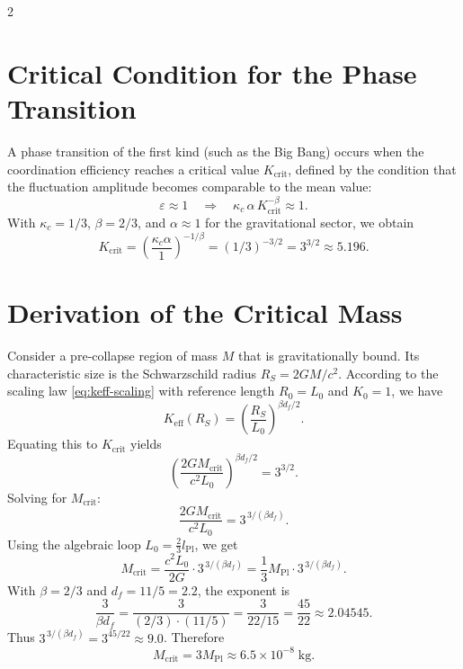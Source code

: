 \documentclass[12pt,a4paper]{article}
\newcommand{\kappac}{\kappa_c}
\newcommand{\Keff}{K_{\mathrm{eff}}}
\newcommand{\betaf}{\beta}
\newcommand{\Lpl}{l_{\mathrm{Pl}}}
\newcommand{\Lzero}{L_0}
\begin{document}
	\begin{multicols}{2}
		
		\section{Critical Condition for the Phase Transition}
		\label{sec:critical-condition}
		
		A phase transition of the first kind (such as the Big Bang) occurs when the coordination efficiency reaches a critical value \(K_{\mathrm{crit}}\), defined by the condition that the fluctuation amplitude becomes comparable to the mean value:
		\begin{equation}
			\varepsilon \approx 1 \quad \Longrightarrow \quad \kappac \, \alpha \, K_{\mathrm{crit}}^{-\betaf} \approx 1.
			\label{eq:critical-condition}
		\end{equation}
		With \(\kappac = 1/3\), \(\betaf = 2/3\), and \(\alpha \approx 1\) for the gravitational sector, we obtain
		\begin{equation}
			K_{\mathrm{crit}} = \left( \frac{\kappac \alpha}{1} \right)^{-1/\betaf} = (1/3)^{-3/2} = 3^{3/2} \approx 5.196.
			\label{eq:Kcrit}
		\end{equation}
		
		\section{Derivation of the Critical Mass}
		\label{sec:derivation}
		
		Consider a pre‑collapse region of mass \(M\) that is gravitationally bound. Its characteristic size is the Schwarzschild radius \(R_S = 2GM/c^2\). According to the scaling law \eqref{eq:keff-scaling} with reference length \(R_0 = \Lzero\) and \(K_0 = 1\), we have
		\[
		\Keff(R_S) = \left( \frac{R_S}{\Lzero} \right)^{\betaf d_f / 2}.
		\]
		Equating this to \(K_{\mathrm{crit}}\) yields
		\[
		\left( \frac{2GM_{\mathrm{crit}}}{c^2 \Lzero} \right)^{\betaf d_f / 2} = 3^{3/2}.
		\]
		Solving for \(M_{\mathrm{crit}}\):
		\[
		\frac{2GM_{\mathrm{crit}}}{c^2 \Lzero} = 3^{\,3/(\betaf d_f)}.
		\]
		Using the algebraic loop \(\Lzero = \frac{2}{3} \Lpl\), we get
		\[
		M_{\mathrm{crit}} = \frac{c^2 \Lzero}{2G} \cdot 3^{\,3/(\betaf d_f)} = \frac{1}{3} M_{\mathrm{Pl}} \cdot 3^{\,3/(\betaf d_f)}.
		\]
		With \(\betaf = 2/3\) and \(d_f = 11/5 = 2.2\), the exponent is
		\[
		\frac{3}{\betaf d_f} = \frac{3}{(2/3) \cdot (11/5)} = \frac{3}{22/15} = \frac{45}{22} \approx 2.04545.
		\]
		Thus \(3^{\,3/(\betaf d_f)} = 3^{45/22} \approx 9.0\). Therefore
		\[
		M_{\mathrm{crit}} = 3 M_{\mathrm{Pl}} \approx 6.5 \times 10^{-8}\;\text{kg}.
		\]
		

\end{multicols}
\end{document}
